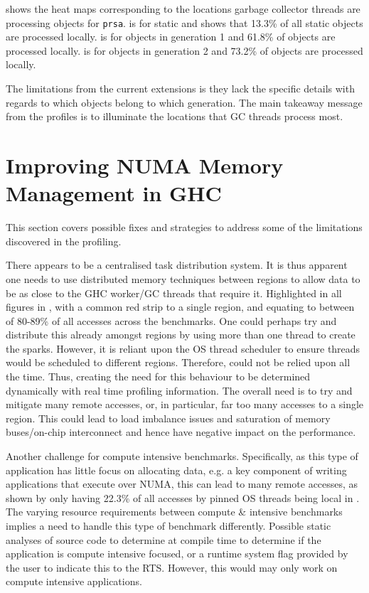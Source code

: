 \documentclass{paper}\usepackage{graphicx}
\begin{document}
 shows the heat maps corresponding to the locations garbage collector threads are processing objects for \lstinline{prsa}.  is for static and shows that 13.3\% of all static objects are processed locally.  is for objects in generation 1 and 61.8\% of objects are processed locally.  is for objects in generation 2 and 73.2\% of objects are processed locally.

The limitations from the current extensions is they lack the specific details with regards to which objects belong to which generation. The main takeaway message from the profiles is to illuminate the locations that GC threads process most.

\section{Improving NUMA Memory \\ Management in GHC}
\label{sec:future_work}

This section covers possible fixes and strategies to address some of the limitations discovered in the profiling.

There appears to be a centralised task distribution system. It is thus apparent one needs to use distributed memory techniques between regions to allow data to be as close to the GHC worker/GC threads that require it. Highlighted in all figures in , with a common red strip to a single region, and equating to between of 80-89\% of all accesses across the benchmarks. One could perhaps try and distribute this already amongst regions by using more than one thread to create the sparks. However, it is reliant upon the OS thread scheduler to ensure threads would be scheduled to different regions. Therefore, could not be relied upon all the time. Thus, creating the need for this behaviour to be determined dynamically with real time profiling information. The overall need is to try and mitigate many remote accesses, or, in particular, far too many accesses to a single region. This could lead to load imbalance issues and saturation of memory buses/on-chip interconnect and hence have negative impact on the performance.

Another challenge for compute intensive benchmarks. Specifically, as this type of application has little focus on allocating data, e.g. a key component of writing applications that execute over NUMA, this can lead to many remote accesses, as shown by only having 22.3\% of all accesses by pinned OS threads being local in . The varying resource requirements between compute \& intensive benchmarks implies a need to handle this type of benchmark differently. Possible static analyses of source code to determine at compile time to determine if the application is compute intensive focused, or a runtime system flag provided by the user to indicate this to the RTS. However, this would may only work on compute intensive applications.
\end{document}
